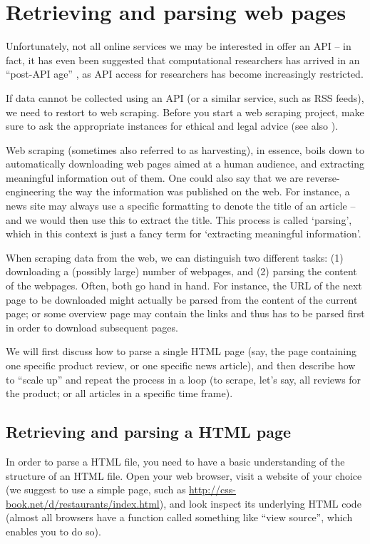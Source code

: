 \section{Retrieving and parsing web pages}
\label{sec:webpages}

Unfortunately, not all online services we may be interested in offer
an API -- in fact, it has even been suggested that computational
researchers has arrived in an ``post-API age'' \citep{Freelon2018}, as
API access for researchers has become increasingly restricted.

If data cannot be collected using an API (or a similar service, such
as RSS feeds), we need to restort to web scraping. Before you start a
web scraping project, make sure to ask the appropriate instances for
ethical and legal advice (see also ).

Web scraping (sometimes also referred to as harvesting), in essence,
boils down to automatically downloading web pages aimed at a human
audience, and extracting meaningful information out of them. One could
also say that we are reverse-engineering the way the information was
published on the web. For instance, a news site may always use a
specific formatting to denote the title of an article -- and we would
then use this to extract the title. This process is called `parsing',
which in this context is just a fancy term for `extracting meaningful
information'.

When scraping data from the web, we can distinguish two different
tasks: (1) downloading a (possibly large) number of webpages, and (2)
parsing the content of the webpages. Often, both go hand in
hand. For instance, the URL of the next page to be downloaded might
actually be parsed from the content of the current page; or some
overview page may contain the links and thus has to be parsed first in
order to download subsequent pages.

We will first discuss how to parse a single HTML page (say, the page
containing one specific product review, or one specific news article),
and then describe how to ``scale up'' and repeat the process in a
loop (to scrape, let's say, all reviews for the product; or all
articles in a specific time frame).




\subsection{Retrieving and parsing a HTML page}
\label{sec:parsehtml}
In order to parse a HTML file, you need to have a basic understanding
of the structure of an HTML file. Open your web browser, visit a
website of your choice (we suggest to use a simple page, such as
\url{http://css-book.net/d/restaurants/index.html}), and
look inspect its underlying HTML code (almost all browsers have a
function called something like ``view source'', which enables you to
do so).

